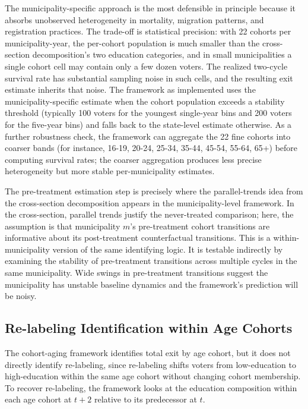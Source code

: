 The municipality-specific approach is the most defensible in principle because it absorbs unobserved heterogeneity in mortality, migration patterns, and registration practices. The trade-off is statistical precision: with 22 cohorts per municipality-year, the per-cohort population is much smaller than the cross-section decomposition's two education categories, and in small municipalities a single cohort cell may contain only a few dozen voters. The realized two-cycle survival rate has substantial sampling noise in such cells, and the resulting exit estimate inherits that noise. The framework as implemented uses the municipality-specific estimate when the cohort population exceeds a stability threshold (typically 100 voters for the youngest single-year bins and 200 voters for the five-year bins) and falls back to the state-level estimate otherwise. As a further robustness check, the framework can aggregate the 22 fine cohorts into coarser bands (for instance, 16-19, 20-24, 25-34, 35-44, 45-54, 55-64, 65+) before computing survival rates; the coarser aggregation produces less precise heterogeneity but more stable per-municipality estimates.

The pre-treatment estimation step is precisely where the parallel-trends idea from the cross-section decomposition appears in the municipality-level framework. In the cross-section, parallel trends justify the never-treated comparison; here, the assumption is that municipality $m$'s pre-treatment cohort transitions are informative about its post-treatment counterfactual transitions. This is a within-municipality version of the same identifying logic. It is testable indirectly by examining the stability of pre-treatment transitions across multiple cycles in the same municipality. Wide swings in pre-treatment transitions suggest the municipality has unstable baseline dynamics and the framework's prediction will be noisy.

\subsection{Re-labeling Identification within Age Cohorts}
\label{ssec:decomposition_mun_relabel}

The cohort-aging framework identifies total exit by age cohort, but it does not directly identify re-labeling, since re-labeling shifts voters from low-education to high-education within the same age cohort without changing cohort membership. To recover re-labeling, the framework looks at the education composition within each age cohort at $t+2$ relative to its predecessor at $t$.

